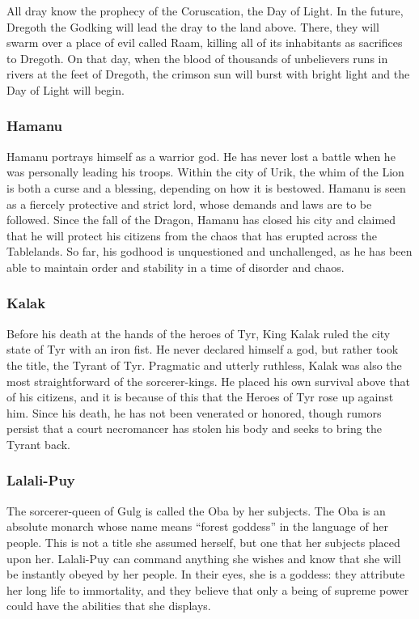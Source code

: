 All dray know the prophecy of the Coruscation, the Day of Light. In the future, Dregoth the Godking will lead the dray to the land above. There, they will swarm over a place of evil called Raam, killing all of its inhabitants as sacrifices to Dregoth. On that day, when the blood of thousands of unbelievers runs in rivers at the feet of Dregoth, the crimson sun will burst with bright light and the Day of Light will begin.

\subsubsection{Hamanu}
Hamanu portrays himself as a warrior god. He has never lost a battle when he was personally leading his troops. Within the city of Urik, the whim of the Lion is both a curse and a blessing, depending on how it is bestowed. Hamanu is seen as a fiercely protective and strict lord, whose demands and laws are to be followed. Since the fall of the Dragon, Hamanu has closed his city and claimed that he will protect his citizens from the chaos that has erupted across the Tablelands. So far, his godhood is unquestioned and unchallenged, as he has been able to maintain order and stability in a time of disorder and chaos.

\subsubsection{Kalak}
Before his death at the hands of the heroes of Tyr, King Kalak ruled the city state of Tyr with an iron fist. He never declared himself a god, but rather took the title, the Tyrant of Tyr. Pragmatic and utterly ruthless, Kalak was also the most straightforward of the sorcerer-kings. He placed his own survival above that of his citizens, and it is because of this that the Heroes of Tyr rose up against him. Since his death, he has not been venerated or honored, though rumors persist that a court necromancer has stolen his body and seeks to bring the Tyrant back.

\subsubsection{Lalali-Puy}
The sorcerer-queen of Gulg is called the Oba by her subjects. The Oba is an absolute monarch whose name means ``forest goddess'' in the language of her people. This is not a title she assumed herself, but one that her subjects placed upon her. Lalali-Puy can command anything she wishes and know that she will be instantly obeyed by her people. In their eyes, she is a goddess: they attribute her long life to immortality, and they believe that only a being of supreme power could have the abilities that she displays.

